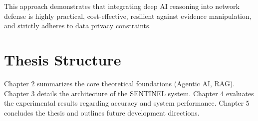 This approach demonstrates that integrating deep AI reasoning into network defense is highly practical, cost-effective, resilient against evidence manipulation, and strictly adheres to data privacy constraints.

\section{Thesis Structure}
Chapter 2 summarizes the core theoretical foundations (Agentic AI, RAG). Chapter 3 details the architecture of the SENTINEL system. Chapter 4 evaluates the experimental results regarding accuracy and system performance. Chapter 5 concludes the thesis and outlines future development directions.
